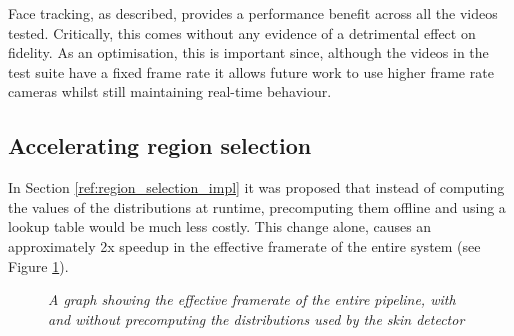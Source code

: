 Face tracking, as described, provides a performance benefit across all the videos tested.
Critically, this comes without any evidence of a detrimental effect on fidelity. As an optimisation, this
is important since, although the videos in the test suite have a fixed frame rate it allows future work to 
use higher frame rate cameras whilst still maintaining real-time behaviour. 

\subsection{Accelerating region selection}
\label{eval:region_selection}
In Section \ref{ref:region_selection_impl} it was proposed that instead of computing the values of the distributions at runtime, precomputing them offline and using a lookup table
would be much less costly. This change alone, causes an approximately 2x speedup in the effective framerate of the entire system (see Figure \ref{fig:precomputed}).
\begin{figure}[H]
    \centering
    \scalebox{0.5}{}
   \caption{\textit{A graph showing the effective framerate of the entire pipeline, with and without precomputing the distributions used by the skin detector}} 
   \label{fig:precomputed}
\end{figure}



